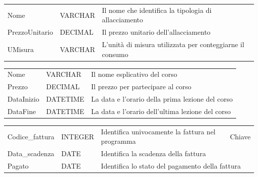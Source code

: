 \begin{center}
    \begin{tabularx}{\textwidth}{|l|l|X|}
        \hline
        \rowcolor{gray!30}
        \multicolumn{3}{|c|}{\textbf{Allacciamento}}\\
        \hline
        Nome & VARCHAR & Il nome che identifica la tipologia di allacciamento\\
        \hline
        PrezzoUnitario & DECIMAL & Il prezzo unitario dell'allacciamento\\
        \hline
        UMisura & VARCHAR & L'unità di misura utilizzata per conteggiarne il consumo\\
        \hline
    \end{tabularx}
\end{center}

\begin{center}
    \begin{tabularx}{\textwidth}{|l|l|X|}
        \hline
        \rowcolor{gray!30}
        \multicolumn{3}{|c|}{\textbf{Corso}}\\
        \hline
        Nome & VARCHAR & Il nome esplicativo del corso \\
        \hline
        Prezzo & DECIMAL & Il prezzo per partecipare al corso\\
        \hline
        DataInizio & DATETIME & La data e l'orario della prima lezione del corso\\
        \hline
        DataFine & DATETIME & La data e l'orario dell'ultima lezione del corso\\
        \hline
    \end{tabularx}
\end{center}

\begin{center}
    \begin{tabularx}{\textwidth}{|l|l|l|X|}
        \hline
        \rowcolor{gray!30}
        \multicolumn{4}{|c|}{\textbf{Fattura}}\\
        \hline
        Codice_fattura & INTEGER & Identifica univocamente la fattura nel programma & Chiave \\
        \hline
        Data_scadenza & DATE & \multicolumn{2}{l|}{Identifica la scadenza della fattura} \\
        \hline
        Pagato & DATE & \multicolumn{2}{l|}{Identifica lo stato del pagamento della fattura} \\
        \hline
    \end{tabularx}
\end{center}

